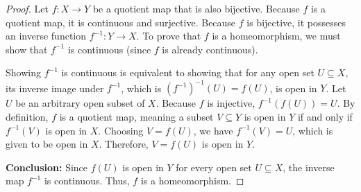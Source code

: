 
\begin{proof}
Let $f\colon X\to Y$ be a quotient map that is also bijective. Because $f$ is a quotient map,
it is continuous and surjective. Because $f$ is bijective, it possesses an inverse function
$f^{-1}\colon Y\to X$. To prove that $f$ is a homeomorphism, we must show that $f^{-1}$ is
continuous (since $f$ is already continuous).

Showing $f^{-1}$ is continuous is equivalent to showing that for any open set $U\subseteq X$,
its inverse image under $f^{-1}$, which is $(f^{-1})^{-1}(U)=f(U)$, is open in $Y$. Let $U$ be an
arbitrary open subset of $X$. Because $f$ is injective, $f^{-1}(f(U))=U$. By definition, $f$ is
a quotient map, meaning a subset $V\subseteq Y$ is open in $Y$ if and only if $f^{-1}(V)$ is
open in $X$. Choosing $V=f(U)$, we have $f^{-1}(V)=U$, which is given to be open in $X$.
Therefore, $V=f(U)$ is open in $Y$.

\textbf{Conclusion:} Since $f(U)$ is open in $Y$ for every open set $U\subseteq X$, the inverse
map $f^{-1}$ is continuous. Thus, $f$ is a homeomorphism.
\end{proof}
